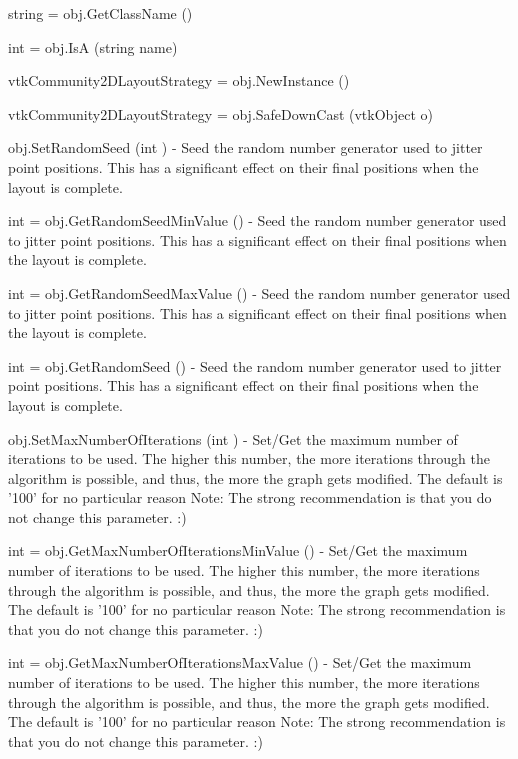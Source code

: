 \begin{DoxyItemize}
\item {\ttfamily string = obj.\-Get\-Class\-Name ()}  
\item {\ttfamily int = obj.\-Is\-A (string name)}  
\item {\ttfamily vtk\-Community2\-D\-Layout\-Strategy = obj.\-New\-Instance ()}  
\item {\ttfamily vtk\-Community2\-D\-Layout\-Strategy = obj.\-Safe\-Down\-Cast (vtk\-Object o)}  
\item {\ttfamily obj.\-Set\-Random\-Seed (int )} -\/ Seed the random number generator used to jitter point positions. This has a significant effect on their final positions when the layout is complete.  
\item {\ttfamily int = obj.\-Get\-Random\-Seed\-Min\-Value ()} -\/ Seed the random number generator used to jitter point positions. This has a significant effect on their final positions when the layout is complete.  
\item {\ttfamily int = obj.\-Get\-Random\-Seed\-Max\-Value ()} -\/ Seed the random number generator used to jitter point positions. This has a significant effect on their final positions when the layout is complete.  
\item {\ttfamily int = obj.\-Get\-Random\-Seed ()} -\/ Seed the random number generator used to jitter point positions. This has a significant effect on their final positions when the layout is complete.  
\item {\ttfamily obj.\-Set\-Max\-Number\-Of\-Iterations (int )} -\/ Set/\-Get the maximum number of iterations to be used. The higher this number, the more iterations through the algorithm is possible, and thus, the more the graph gets modified. The default is '100' for no particular reason Note\-: The strong recommendation is that you do not change this parameter. \-:)  
\item {\ttfamily int = obj.\-Get\-Max\-Number\-Of\-Iterations\-Min\-Value ()} -\/ Set/\-Get the maximum number of iterations to be used. The higher this number, the more iterations through the algorithm is possible, and thus, the more the graph gets modified. The default is '100' for no particular reason Note\-: The strong recommendation is that you do not change this parameter. \-:)  
\item {\ttfamily int = obj.\-Get\-Max\-Number\-Of\-Iterations\-Max\-Value ()} -\/ Set/\-Get the maximum number of iterations to be used. The higher this number, the more iterations through the algorithm is possible, and thus, the more the graph gets modified. The default is '100' for no particular reason Note\-: The strong recommendation is that you do not change this parameter. \-:)  

\end{DoxyItemize}
